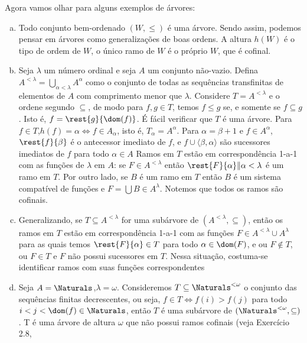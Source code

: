 \documentclass[a4paper]{article}
\theoremstyle{plain}\newtheorem{teo}{Teorema}[section]
\theoremstyle{plain}\newtheorem{prop}[teo]{Proposição}
\theoremstyle{plain}\newtheorem{lem}[teo]{Lema}
\theoremstyle{plain}\newtheorem{cor}[teo]{Corolário}
\theoremstyle{definition}\newtheorem{defi}[teo]{Definição}
\theoremstyle{remark}\newtheorem{rem}[teo]{Observação}
\theoremstyle{definition}\newtheorem{example}[teo]{Exemplo}
\theoremstyle{remark}\newtheorem{step}{\bf Step}
\begin{document}
  Agora vamos olhar para alguns exemplos de árvores:
  \begin{exemplo}\hfill
    \begin{enumerate}[(a)]
    \item Todo conjunto bem-ordenado \((W,\leq)\) é uma árvore. Sendo assim,
      podemos pensar em árvores como generalizações de boas ordens. A altura
      \(h(W)\) é o tipo de ordem de \(W\), o único ramo de \(W\) é o próprio
      \(W\), que é cofinal.
    \item Seja \(\lambda\) um número ordinal e seja \(A\) um conjunto não-vazio.
      Defina \(A^{< \lambda}=\bigcup_{\alpha < \lambda} A^\alpha\) como o
      conjunto de todas as sequências transfinitas de elementos de \(A\) com
      comprimento menor que \(\lambda\). Considere \(T=A^{< \lambda}\) e o
      ordene segundo \(\subseteq\), de modo para \(f,g\in T\), temos \(f\leq g\)
      se, e somente se \(f\subseteq g\). Isto é, \(f=\rest{g}{\dom(f)}\). É fácil
      verificar que \(T\) é uma árvore. Para \(f\in T\),\(h(f)=\alpha \iff f\in A_\alpha\),
      isto é, \(T_\alpha =A^\alpha\). Para \(\alpha =\beta +1\) e \(f\in A^\alpha\),
      \(\rest{f}{\beta}\) é o antecessor imediato de \(f\), e \(f\cup {\langle \beta ,\alpha \rangle}\)
      são sucessores imediatos de \(f\) para todo \(\alpha \in A\)
      Ramos em \(T\) estão em correspondência 1-a-1 com as funções de \(\lambda\) em \(A\):
      se \(F\in A^{< \lambda}\) então \({\rest{F}{\alpha}\| \alpha <\lambda}\) é um ramo em \(T\).
      Por outro lado, se \(B\) é um ramo em \(T\) então \(B\) é um sistema compatível de funções
      e \(F=\bigcup B\in A^\lambda\). Notemos que todos os ramos são cofinais.
    \item Generalizando, se \(T\subseteq A^{<\lambda}\) for uma subárvore de 
    \((A^{<\lambda},\subseteq)\), então os ramos em \(T\) estão em correspondência
    1-a-1 com as funções \(F\in A^{<\lambda}\cup A^\lambda\) para as quais temos
    \(\rest{F}{\alpha}\in T\) para todo \(\alpha \in \dom(F)\), e ou \(F\notin T\),
    ou \(F\in T\) e \(F\) não possui sucessores em \(T\). Nessa situação, costuma-se
    identificar ramos com suas funções correspondentes
    \item Seja \(A=\Naturals \),\(\lambda =\omega\). Consideremos \(T\subseteq \Naturals^{<\omega}\)
    o conjunto das sequências finitas decrescentes, ou seja, \(f\in T \iff f(i)>f(j)\) 
    para todo \(i<j<\dom(f)\in\Naturals\), então \(T\) é uma subárvore de \((\Naturals^{<\omega},\subseteq)\).
    T é uma árvore de altura \(\omega\) que não possui ramos cofinais (veja Exercício 2.8,

\end{enumerate}
\end{exemplo}
\end{document}
